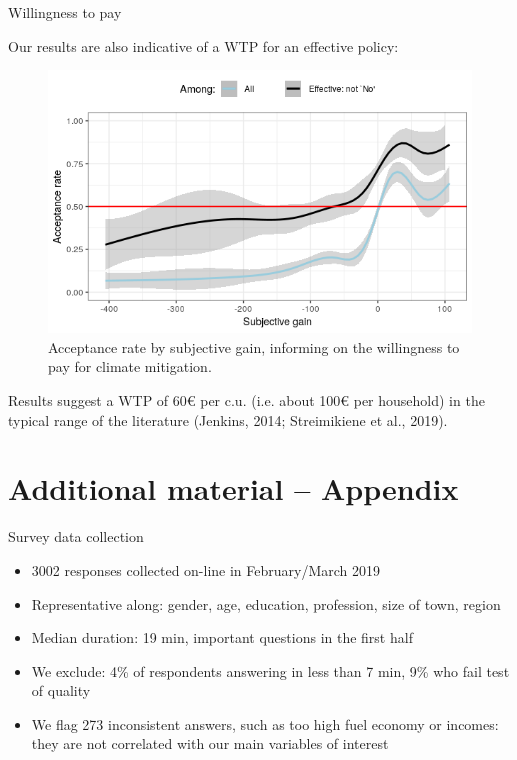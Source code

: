 \documentclass[aspectratio=169,9pt,dvipsnames]{beamer}
\begin{document}
    \begin{frame}{Willingness to pay}

Our results are also indicative of a WTP for an effective policy:

\begin{figure}[H]
\centering
\includegraphics[width=0.6\columnwidth]{Images/WTP_Both.png}
\caption{Acceptance rate by subjective gain, informing on the willingness to pay for climate mitigation.}
\label{fig:WTP}
\end{figure}

\medskip

Results suggest a WTP of 60\euro{} per c.u. (i.e. about 100\euro{} per household) in the typical range of the literature (Jenkins, 2014; Streimikiene et al., 2019).

    \end{frame}


\section{Additional material -- Appendix}

\begin{frame}{Survey data collection}

    \begin{itemize}
        \item 3002 responses collected on-line in February/March 2019
        \item Representative along: gender, age, education, profession, size of town, region
        \item Median duration: 19 min, important questions in the first half
        \item We exclude: 4\% of respondents answering in less than 7 min, 9\% who fail test of quality
        \item We flag 273 inconsistent answers, such as too high fuel economy or incomes: they are not correlated with our main variables of interest
    \end{itemize}
        \hspace{0.5cm} 
    
\end{frame}
\end{document}
